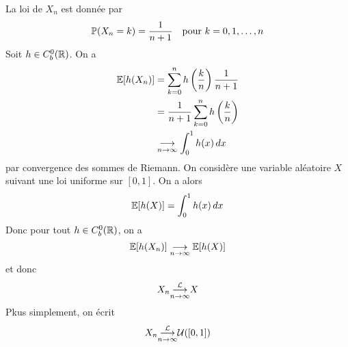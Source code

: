 \begin{example}
    La loi de \(X_n\) est donnée par
    \begin{equation*}
        \mathbb{P}(X_n = k) = \frac1{n+1} \quad \text{pour } k=0,1,\ldots,n
    \end{equation*}
    Soit \(h\in C_b^0(\mathbb{R})\). On a
    \begin{equation*}
        \begin{aligned}
            \mathbb{E}[h(X_n)] 
            &= \sum_{k=0}^n h\left(\frac kn\right) \frac1{n+1}\\
            &= \frac1{n+1} \sum_{k=0}^n h\left(\frac kn\right)\\
            &\underset{n\to\infty}{\longrightarrow} \int_0^1 h(x) \mathop{}\!{d} x
        \end{aligned}
    \end{equation*}
    par convergence des sommes de Riemann. On considère une variable aléatoire
    \(X\) suivant une loi uniforme sur \([0,1]\). On a alors
    \begin{equation*}
        \mathbb{E}[h(X)] = \int_0^1 h(x) \mathop{}\!{d} x
    \end{equation*}
    Donc pour tout \(h\in C_b^0(\mathbb{R})\), on a
    \begin{equation*}
        \mathbb{E}[h(X_n)] \underset{n\to\infty}{\longrightarrow} \mathbb{E}[h(X)]
    \end{equation*}
    et donc
    \begin{equation*}
        X_n \underset{n\to\infty}{{\overset{\mathcal{L}}{\longrightarrow}}} X
    \end{equation*}
    Pkus simplement, on écrit
    \begin{equation*}
        X_n \underset{n\to\infty}{{\overset{\mathcal{L}}{\longrightarrow}}} \mathcal U([0,1])
    \end{equation*}
\end{example}

